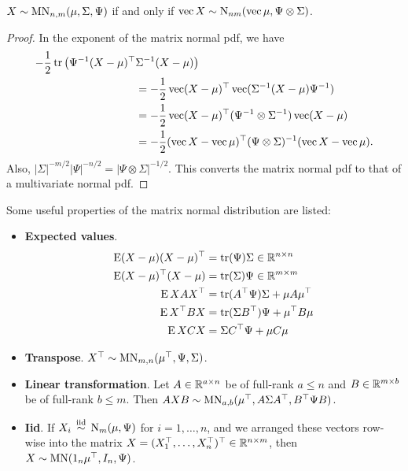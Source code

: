 \begin{lemma}
  $X\sim\operatorname{MN}_{n,m}(\mu,\Sigma,\Psi)$ if and only if $\operatorname{vec} X\sim \operatorname{N}_{nm}(\operatorname{vec}\mu,\Psi \otimes \Sigma)$.
\end{lemma}

\begin{proof}
  In the exponent of the matrix normal pdf, we have
  \begin{align*}
    -\frac{1}{2} \operatorname{tr} \big(\Psi^{-1}(X-\mu)^\top &\Sigma^{-1}(X-\mu)\big) \\
    &= -\frac{1}{2} \operatorname{vec}(X-\mu)^\top \operatorname{vec}(\Sigma^{-1}(X-\mu)\Psi^{-1}) \\
    &= -\frac{1}{2} \operatorname{vec}(X-\mu)^\top (\Psi^{-1} \otimes \Sigma^{-1}) \operatorname{vec}(X-\mu) \\
    &= -\frac{1}{2} (\operatorname{vec} X- \operatorname{vec} \mu)^\top (\Psi \otimes \Sigma)^{-1} (\operatorname{vec} X- \operatorname{vec} \mu).     
  \end{align*} 
  Also, $|\Sigma|^{-m/2}|\Psi|^{-n/2} = |\Psi \otimes \Sigma|^{-1/2}$.
  This converts the matrix normal pdf to that of a multivariate normal pdf.
\end{proof}

Some useful properties of the matrix normal distribution are listed:
\begin{itemize}
  \item \textbf{Expected values}.
  \begin{align*}
    \operatorname{E} (X-\mu)(X-\mu)^\top &= \operatorname{tr}(\Psi)\Sigma \in \mathbb{R}^{n\times n} \\
    \operatorname{E} (X-\mu)^\top(X-\mu) &= \operatorname{tr}(\Sigma)\Psi \in \mathbb{R}^{m\times m} \\
    \operatorname{E} XAX^\top &= \operatorname{tr}(A^\top\Psi)\Sigma + \mu A\mu^\top \\
    \operatorname{E} X^\top BX &= \operatorname{tr}(\Sigma B^\top)\Psi + \mu^\top B\mu \\   
    \operatorname{E} X CX &=  \Sigma C^\top\Psi  + \mu C \mu \\    
  \end{align*} 
  \item \textbf{Transpose}. $X^\top \sim \operatorname{MN}_{m,n}(\mu^\top, \Psi, \Sigma)$.
  \item \textbf{Linear transformation}. Let $A \in \mathbb{R}^{a \times n}$ be of full-rank $a \leq n$ and $B \in \mathbb{R}^{m \times b}$ be of full-rank $b\leq m$. Then $AXB  \sim \operatorname{MN}_{a,b}(\mu^\top, A\Sigma A^\top, B^\top \Psi B)$.
  \item \textbf{Iid}. If $X_i \,\overset{\text{iid}}{\sim}\, \operatorname{N}_m(\mu,\Psi)$ for $i=1,\dots,n$, and we arranged these vectors row-wise into the matrix $X = (X_1^\top,\dots,X_n^\top)^\top \in \mathbb{R}^{n\times m}$, then $X \sim \operatorname{MN}(1_n \mu^\top, I_n, \Psi)$.
\end{itemize}


